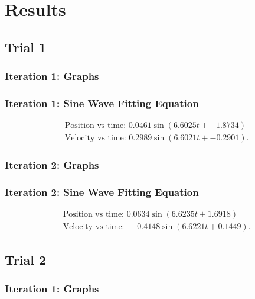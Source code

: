 \documentclass{report}
\begin{document}
     \pagebreak 
     \section{Results}
     \bigbreak \noindent 

     \bigbreak \noindent 
     \subsection{Trial 1}
     \bigbreak \noindent 
     \subsubsection{Iteration 1: Graphs}
     \bigbreak \noindent 
     \bigbreak \noindent 
     \subsubsection{Iteration 1: Sine Wave Fitting Equation}
     \begin{align*}
        &\text{Position vs time: } 0.0461\sin{(6.6025t + -1.8734)} \\
        &\text{Velocity vs time: } 0.2989\sin{(6.6021t + -0.2901)}
    .\end{align*}

    \bigbreak \noindent 
    \subsubsection{Iteration 2: Graphs}
    \bigbreak \noindent 

    \bigbreak \noindent 
    \subsubsection{Iteration 2: Sine Wave Fitting Equation}
    \begin{align*}
        &\text{Position vs time: } 0.0634\sin{(6.6235t + 1.6918)} \\
        &\text{Velocity vs time: } -0.4148\sin{(6.6221t + 0.1449)}
    .\end{align*}

    \pagebreak 
    \subsection{Trial 2}

    \bigbreak \noindent 
    \subsubsection{Iteration 1: Graphs} 
\end{document}
